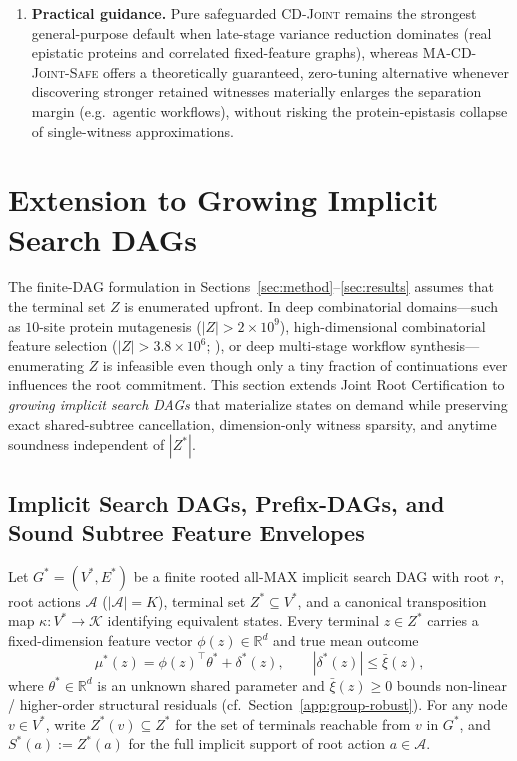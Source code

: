 \documentclass{article}
\theoremstyle{plain}
\theoremstyle{definition}
\begin{document}
\begin{enumerate}[leftmargin=1.6em]
  \item \textbf{Practical guidance.} Pure safeguarded \textsc{CD-Joint} remains the strongest general-purpose default when late-stage variance reduction dominates (real epistatic proteins and correlated fixed-feature graphs), whereas \textsc{MA-CD-Joint-Safe} offers a theoretically guaranteed, zero-tuning alternative whenever discovering stronger retained witnesses materially enlarges the separation margin (e.g.\ agentic workflows), without risking the protein-epistasis collapse of single-witness approximations.
\end{enumerate}

\clearpage
\section{Extension to Growing Implicit Search DAGs}
\label{app:growing-dags}

The finite-DAG formulation in Sections~\ref{sec:method}--\ref{sec:results} assumes that the terminal set $Z$ is enumerated upfront. In deep combinatorial domains---such as $10$-site protein mutagenesis ($|Z| > 2 \times 10^9$), high-dimensional combinatorial feature selection ($|Z| > 3.8 \times 10^6$; \citealt{pelissier}), or deep multi-stage workflow synthesis---enumerating $Z$ is infeasible even though only a tiny fraction of continuations ever influences the root commitment. This section extends Joint Root Certification to \emph{growing implicit search DAGs} that materialize states on demand while preserving exact shared-subtree cancellation, dimension-only witness sparsity, and anytime soundness independent of $|Z^*|$.

\subsection{Implicit Search DAGs, Prefix-DAGs, and Sound Subtree Feature Envelopes}
\label{app:growing-model}

Let $G^* = (V^*, E^*)$ be a finite rooted all-MAX implicit search DAG with root $r$, root actions $\mathcal{A}$ ($|\mathcal{A}| = K$), terminal set $Z^* \subseteq V^*$, and a canonical transposition map $\kappa : V^* \to \mathcal{K}$ identifying equivalent states. Every terminal $z \in Z^*$ carries a fixed-dimension feature vector $\phi(z) \in \mathbb{R}^d$ and true mean outcome
\begin{equation}
  \mu^*(z) = \phi(z)^\top \theta^* + \delta^*(z), \qquad |\delta^*(z)| \le \bar\xi(z),
  \label{eq:growing-truth}
\end{equation}
where $\theta^* \in \mathbb{R}^d$ is an unknown shared parameter and $\bar\xi(z) \ge 0$ bounds non-linear / higher-order structural residuals (cf.\ Section~\ref{app:group-robust}). For any node $v \in V^*$, write $Z^*(v) \subseteq Z^*$ for the set of terminals reachable from $v$ in $G^*$, and $S^*(a) := Z^*(a)$ for the full implicit support of root action $a \in \mathcal{A}$.
\end{document}
